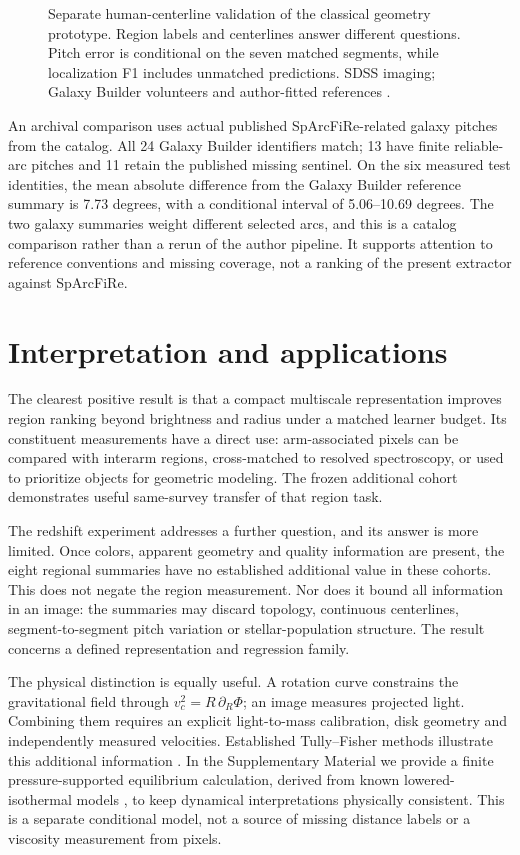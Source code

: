 \documentclass[11pt]{article}
\begin{document}
\begin{figure}[htbp]
\centering{}
\caption{Separate human-centerline validation of the classical geometry
prototype. Region labels and centerlines answer different questions. Pitch
error is conditional on the seven matched segments, while localization F1
includes unmatched predictions. SDSS imaging; Galaxy Builder volunteers and
author-fitted references \citep{lingard2020,lingard2021}.}
\label{fig:centerlines}
\end{figure}

An archival comparison uses actual published SpArcFiRe-related galaxy pitches
from the \citet{hart2017} catalog. All 24 Galaxy Builder identifiers match;
13 have finite reliable-arc pitches and 11 retain the published missing
sentinel. On the six measured test identities, the mean absolute difference
from the Galaxy Builder reference summary is 7.73 degrees, with a conditional
interval of 5.06--10.69 degrees. The two galaxy summaries weight different
selected arcs, and this is a catalog comparison rather than a rerun of the
author pipeline. It supports attention to reference conventions and missing
coverage, not a ranking of the present extractor against SpArcFiRe.

\FloatBarrier
\section{Interpretation and applications}
The clearest positive result is that a compact multiscale representation
improves region ranking beyond brightness and radius under a matched learner
budget. Its constituent measurements have a direct use: arm-associated pixels
can be compared with interarm regions, cross-matched to resolved spectroscopy,
or used to prioritize objects for geometric modeling. The frozen additional
cohort demonstrates useful same-survey transfer of that region task.

The redshift experiment addresses a further question, and its answer is more
limited. Once colors, apparent geometry and quality information are present,
the eight regional summaries have no established additional value in these
cohorts. This does not negate the region measurement. Nor does it bound all
information in an image: the summaries may discard topology, continuous
centerlines, segment-to-segment pitch variation or stellar-population structure.
The result concerns a defined representation and regression family.

The physical distinction is equally useful. A rotation curve constrains the
gravitational field through $v_c^2=R\,\partial_R\Phi$; an image measures
projected light. Combining them requires an explicit light-to-mass calibration,
disk geometry and independently measured velocities. Established Tully--Fisher
methods illustrate this additional information \citep{tully1977,schombert2020}.
In the Supplementary Material we provide a finite pressure-supported equilibrium
calculation, derived from known lowered-isothermal models
\citep{king1966,gieles2015}, to keep dynamical interpretations physically
consistent. This is a separate conditional model, not a source of missing
distance labels or a viscosity measurement from pixels.
\end{document}

